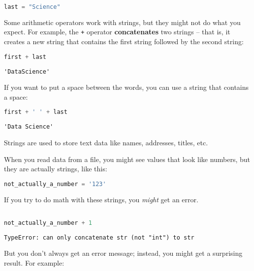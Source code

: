 \begin{lstlisting}[language=Python,style=source]
last = "Science"
\end{lstlisting}

Some arithmetic operators work with strings, but they might not do what
you expect. For example, the \passthrough{\lstinline!+!} operator
\textbf{concatenates} two strings -- that is, it creates a new string
that contains the first string followed by the second string:

\begin{lstlisting}[language=Python,style=source]
first + last
\end{lstlisting}

\begin{lstlisting}[style=output]
'DataScience'
\end{lstlisting}

If you want to put a space between the words, you can use a string that
contains a space:

\begin{lstlisting}[language=Python,style=source]
first + ' ' + last
\end{lstlisting}

\begin{lstlisting}[style=output]
'Data Science'
\end{lstlisting}

Strings are used to store text data like names, addresses, titles, etc.

When you read data from a file, you might see values that look like
numbers, but they are actually strings, like this:

\begin{lstlisting}[language=Python,style=source]
not_actually_a_number = '123'
\end{lstlisting}

If you try to do math with these strings, you \emph{might} get an error.

\begin{lstlisting}[language=Python,style=source]
%%expect TypeError

not_actually_a_number + 1
\end{lstlisting}

\begin{lstlisting}[style=output]
TypeError: can only concatenate str (not "int") to str
\end{lstlisting}

But you don't always get an error message; instead, you might get a
surprising result. For example:

